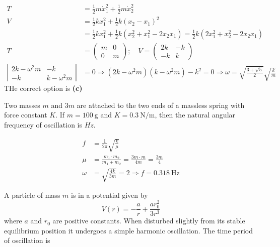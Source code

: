 \begin{enumerate}
\begin{answer}
	\begin{align*}
		T&=\frac{1}{2} m \dot{x}_{1}^{2}+\frac{1}{2} m \dot{x}_{2}^{2}\\
		V&=\frac{1}{2} k x_{1}^{2}+\frac{1}{2} k\left(x_{2}-x_{1}\right)^{2}\\
		&=\frac{1}{2} k x_{1}^{2}+\frac{1}{2} k\left(x_{2}^{2}+x_{1}^{2}-2 x_{2} x_{1}\right)=\frac{1}{2} k\left(2 x_{1}^{2}+x_{2}^{2}-2 x_{2} x_{1}\right)\\
		T&=\left(\begin{array}{cc}
		m & 0 \\
		0 & m
		\end{array}\right) ; \quad V=\left(\begin{array}{cc}
		2 k & -k \\
		-k & k
		\end{array}\right)\\
		\left|\begin{array}{cc}
		2 k-\omega^{2} m & -k \\
		-k & k-\omega^{2} m
		\end{array}\right|&=0 \Rightarrow\left(2 k-\omega^{2} m\right)\left(k-\omega^{2} m\right)-k^{2}=0 \Rightarrow \omega=\sqrt{\frac{3+\sqrt{5}}{2}} \sqrt{\frac{k}{m}}
	\end{align*}
THe correct option is \textbf{(c)}
\end{answer}
\begin{minipage}{\textwidth}
	\item Two masses $m$ and $3 m$ are attached to the two ends of a massless spring with force constant $K$. If $m=100 \mathrm{~g}$ and $K=0.3 \mathrm{~N} / \mathrm{m}$, then the natural angular frequency of oscillation is $H z$.
\end{minipage}
\begin{answer}
	\begin{align*}
	f&=\frac{1}{2 \pi} \sqrt{\frac{k}{\mu}}\\
	\mu&=\frac{m_{1} \cdot m_{2}}{m_{1}+m_{2}}=\frac{3 m \cdot m}{4 m}=\frac{3 m}{4}\\
	\omega&=\sqrt{\frac{4 k}{3 m}}=2 \Rightarrow f=0.318 \mathrm{~Hz}
	\end{align*}
\end{answer}
\begin{minipage}{\textwidth}
	\item A particle of mass $m$ is in a potential given by
	$$
	V(r)=-\frac{a}{r}+\frac{a r_{0}^{2}}{3 r^{3}}
	$$
	where $a$ and $r_{0}$ are positive constants. When disturbed slightly from its stable equilibrium position it undergoes a simple harmonic oscillation. The time period of oscillation is

\end{minipage}
\end{enumerate}

